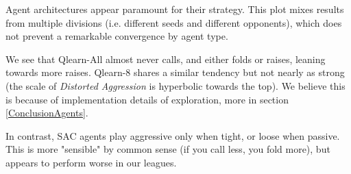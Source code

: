 Agent architectures appear paramount for their strategy. This plot mixes results from multiple divisions (i.e. different seeds and different opponents), which does not prevent a remarkable convergence by agent type.

We see that Qlearn-All almost never calls, and either folds or raises, leaning towards more raises. Qlearn-8 shares a similar tendency but not nearly as strong (the scale of \textit{Distorted Aggression} is hyperbolic towards the top). We believe this is because of implementation details of exploration, more in section \ref{ConclusionAgents}.

In contrast, SAC agents play aggressive only when tight, or loose when passive. This is more "sensible" by common sense (if you call less, you fold more), but appears to perform worse in our leagues.


